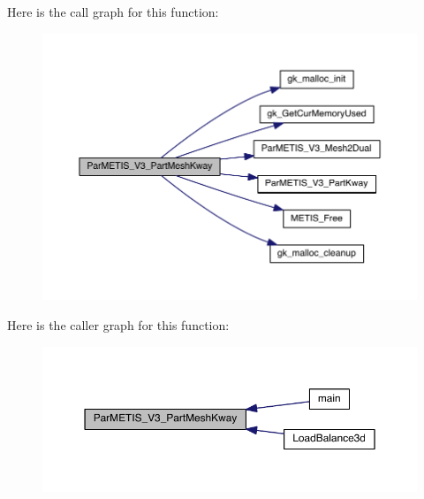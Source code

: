 Here is the call graph for this function\+:\nopagebreak
\begin{figure}[H]
\begin{center}
\leavevmode
\includegraphics[width=350pt]{a00374_a800266372258ca13cc60f863cb34b4b7_cgraph}
\end{center}
\end{figure}
Here is the caller graph for this function\+:\nopagebreak
\begin{figure}[H]
\begin{center}
\leavevmode
\includegraphics[width=350pt]{a00374_a800266372258ca13cc60f863cb34b4b7_icgraph}
\end{center}
\end{figure}
